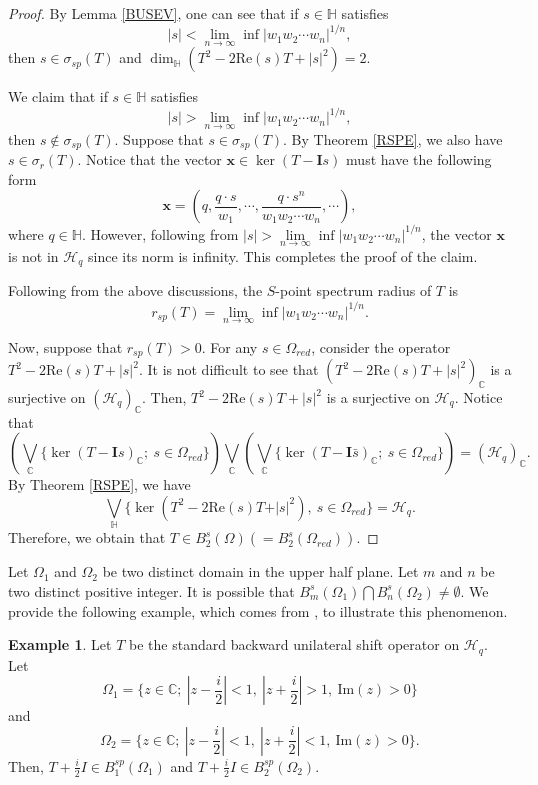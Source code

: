 \documentclass[pdflatex,sn-mathphys-num]{sn-jnl}%
\theoremstyle{thmstyleone}%
\theoremstyle{thmstyletwo}%
\newtheorem{example}{Example}%
\theoremstyle{thmstylethree}%
\theoremstyle{definition}
\newtheorem{example}[theorem]{Example}
\theoremstyle{remark}
\begin{document}
    \begin{proof}
    By Lemma \ref{BUSEV}, one can see that if $s\in\mathbb{H}$ satisfies
    \[
    |s|<\lim\limits_{n\to\infty}\inf |w_{1}w_{2}\cdots w_{n}|^{{1}/{n}},
    \]
    then $s\in\sigma_{sp}(T)$ and $\dim_{\mathbb{H}}(T^2-2\mathrm{Re}(s)T+|s|^2)=2$.

We claim that if $s\in\mathbb{H}$ satisfies
\[
|s|>\lim\limits_{n\to\infty}\inf |w_{1}w_{2}\cdots w_{n}|^{{1}/{n}},
\]
then $s\notin\sigma_{sp}(T)$. Suppose that $s\in\sigma_{sp}(T)$. By Theorem \ref{RSPE}, we also have $s\in\sigma_{r}(T)$. Notice that the vector $\boldsymbol{x}\in\ker(T-\boldsymbol{I}s)$ must have the following form
\[
\boldsymbol{x}=(q, \frac{q\cdot s}{w_1}, \cdots, \frac{q\cdot s^n}{w_1w_2\cdots w_n}, \cdots),
\]
where $q\in \mathbb{H}$. However, following from $|s|>\lim\limits_{n\to\infty}\inf |w_{1}w_{2}\cdots w_{n}|^{{1}/{n}}$, the vector $\boldsymbol{x}$ is not in $\mathcal{H}_q$ since its norm is infinity. This completes the proof of the claim.

Following from the above discussions, the $S$-point spectrum radius of $T$ is
\[
r_{sp}(T)=\lim\limits_{n\to\infty}\inf |w_{1}w_{2}\cdots w_{n}|^{{1}/{n}}.
\]

Now, suppose that $r_{sp}(T)>0$. For any $s\in\Omega_{red}$, consider the operator $T^2-2\mathrm{Re}(s)T+|s|^2$. It is not difficult to see that $(T^2-2\mathrm{Re}(s)T+|s|^2)_{\mathbb{C}}$ is a surjective on $(\mathcal{H}_q)_{\mathbb{C}}$. Then, $T^2-2\mathrm{Re}(s)T+|s|^2$ is a surjective on $\mathcal{H}_{q}$. Notice that
\[
\left({\bigvee}_{\mathbb{C}}\{\ker(T-\boldsymbol{I}s)_{\mathbb{C}}; \ s\in\Omega_{red}\}\right){\bigvee}_{\mathbb{C}}\left({\bigvee}_{\mathbb{C}}\{\ker(T-\boldsymbol{I}\bar{s})_{\mathbb{C}}; \ s\in\Omega_{red}\}\right)=(\mathcal{H}_q)_{\mathbb{C}}.
\]
By Theorem \ref{RSPE}, we  have
\[
{\bigvee}_{\mathbb{H}} \{\ker(T^2-2\mathrm{Re}(s) T+\vert s \vert^2),\ s\in\Omega_{red}\}=\mathcal{H}_q.
\]
Therefore, we obtain that $T\in B_2^{s}(\Omega) (=B_2^{s}(\Omega_{red}))$.
  \end{proof}

Let $\Omega_1$ and $\Omega_2$ be two distinct domain in the upper half plane. Let $m$ and $n$ be two distinct positive integer. It is possible that $B_m^{s}(\Omega_1)\bigcap B_n^{s}(\Omega_2)\neq\emptyset$.
We provide the following example, which comes from \cite{HT}, to illustrate this phenomenon.


\begin{example}\label{TCI}
	Let $T$ be the standard backward unilateral shift operator on $\mathcal{H}_q$. Let
	\[
	\Omega_1=\{z\in\mathbb{C};\ |z-\frac{i}{2}|<1,\ |z+\frac{i}{2}|>1,\ \mathrm{Im}(z)>0\}
	\]
	and
	\[
	\Omega_2=\{z\in\mathbb{C};\ |z-\frac{i}{2}|<1,\ |z+\frac{i}{2}|<1,\ \mathrm{Im}(z)>0\}.
	\]
	Then, $T+\frac{i}{2}I\in B_1^{sp}(\Omega_1)$ and $T+\frac{i}{2}I\in B_2^{sp}(\Omega_2)$.
	\end{example}
		
\end{document}
